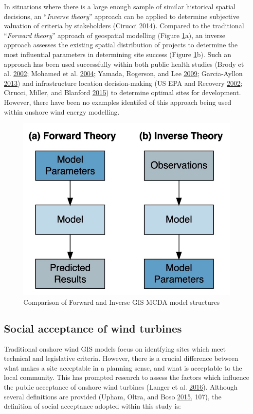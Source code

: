 \documentclass[a4paper,]{article}
\theoremstyle{definition}
\theoremstyle{definition}
\theoremstyle{definition}
\theoremstyle{remark}
\begin{document}
In situations where there is a large enough sample of similar historical
spatial decisions, an ``\emph{Inverse theory}'' approach can be applied
to determine subjective valuation of criteria by stakeholders (Cirucci
\protect\hyperlink{ref-Cirucci2014}{2014}). Compared to the traditional
``\emph{Forward theory}'' approach of geospatial modelling (Figure
\ref{fig:InverseGIS}a), an inverse approach assesses the existing
spatial distribution of projects to determine the most influential
parameters in determining site success (Figure \ref{fig:InverseGIS}b).
Such an approach has been used successfully within both public health
studies (Brody et al. \protect\hyperlink{ref-Brody2002}{2002}; Mohamed
et al. \protect\hyperlink{ref-Mohamed2004}{2004}; Yamada, Rogerson, and
Lee \protect\hyperlink{ref-Yamada2009}{2009}; Garcia-Ayllon
\protect\hyperlink{ref-Garcia-Ayllon2013}{2013}) and infrastructure
location decision-making (US EPA and Recovery
\protect\hyperlink{ref-USEPA2002}{2002}; Cirucci, Miller, and Blanford
\protect\hyperlink{ref-Cirucci2015}{2015}) to determine optimal sites
for development. However, there have been no examples identifed of this
approach being used within onshore wind energy modelling.

\begin{figure}[h]

{\centering \includegraphics[width=0.5\linewidth]{figures/figure4} 

}

\caption{Comparison of Forward and Inverse GIS MCDA model structures}\label{fig:InverseGIS}
\end{figure}

\hypertarget{acceptance}{%
\subsection{Social acceptance of wind turbines}\label{acceptance}}

Traditional onshore wind GIS models focus on identfying sites which meet
technical and legislative criteria. However, there is a crucial
difference between what makes a site acceptable in a planning sense, and
what is acceptable to the local community. This has prompted research to
assess the factors which influence the public acceptance of onshore wind
turbines (Langer et al. \protect\hyperlink{ref-Langer2016}{2016}).
Although several definitions are provided (Upham, Oltra, and Boso
\protect\hyperlink{ref-Upham2015}{2015}, 107), the definition of social
acceptance adopted within this study is:
\end{document}
